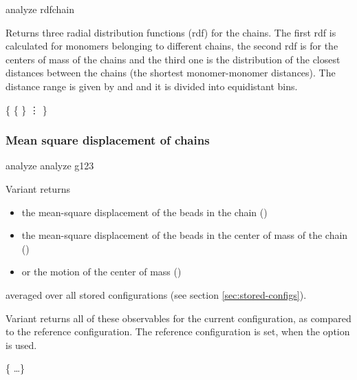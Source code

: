 \begin{essyntax}
 analyze rdfchain    
\end{essyntax}
Returns three radial distribution functions (rdf) for the chains. The
first rdf is calculated for monomers belonging to different chains,
the second rdf is for the centers of mass of the chains and the third
one is the distribution of the closest distances between the chains
(\ie the shortest monomer-monomer distances). The distance range is
given by  and  and it is divided into
 equidistant bins.

\begin{code}
\{ 
  \{    \}
  \vdots
\}
\end{code}

\subsubsection{Mean square displacement of chains}
\label{analyze:<g1>}
\label{analyze:<g2>}
\label{analyze:<g3>}
\label{analyze:g123}

\begin{essyntax}
   analyze  
   analyze g123  
\end{essyntax}

Variant  returns 
\begin{itemize}
\item the mean-square displacement of the beads in the
  chain ()
\item the mean-square displacement of the beads in the center of
  mass of the chain ()
\item or the motion of the center of mass ()
\end{itemize}
averaged over all stored configurations (see section
\vref{sec:stored-configs}).

Variant  returns all of these observables for the current
configuration, as compared to the reference configuration. The
reference configuration is set, when the option  is used.

\begin{code}
  \{   \dots \}
\end{code}

